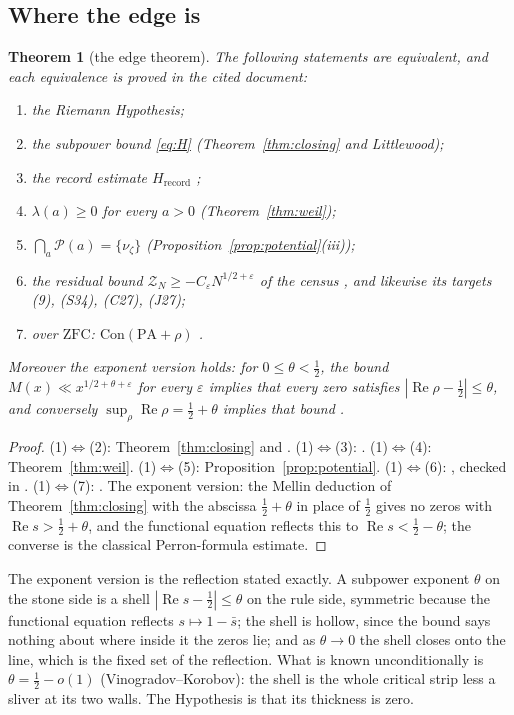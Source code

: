 \documentclass[11pt]{article}
\newtheorem{theorem}{Theorem}[section]
\theoremstyle{definition}
\theoremstyle{remark}
\newcommand{\PA}{\mathrm{PA}}
\newcommand{\ZFC}{\mathrm{ZFC}}
\newcommand{\Con}{\mathrm{Con}}
\newcommand{\PS}{\mathcal P}
\newcommand{\Hrec}{H_{\mathrm{record}}}
\newcommand{\Ree}{\operatorname{Re}}
\begin{document}
\subsection{Where the edge is}
\begin{theorem}[the edge theorem]\label{thm:edge}
The following statements are equivalent, and each equivalence is proved in the cited document:
\begin{enumerate}
\item[(1)] the Riemann Hypothesis;
\item[(2)] the subpower bound \eqref{eq:H} (Theorem~\ref{thm:closing} and Littlewood);
\item[(3)] the record estimate $\Hrec$ \cite[Thm.\ 3.1]{hrec};
\item[(4)] $\lambda(a)\ge0$ for every $a>0$ (Theorem~\ref{thm:weil});
\item[(5)] $\bigcap_a\PS(a)=\{\nu_\zeta\}$ (Proposition~\ref{prop:potential}(iii));
\item[(6)] the residual bound $\mathcal Z_N\ge-C_\varepsilon N^{1/2+\varepsilon}$ of the census \cite[\S62]{census}, and likewise its targets (9), (S34), (C27), (J27);
\item[(7)] over $\ZFC$: $\Con(\PA+\rho)$ \cite[Thm.\ 5.1]{gstring}.
\end{enumerate}
Moreover the exponent version holds: for $0\le\theta<\tfrac12$, the bound $M(x)\ll x^{1/2+\theta+\varepsilon}$ for every $\varepsilon$ implies that every zero satisfies $|\Ree\rho-\tfrac12|\le\theta$, and conversely $\sup_\rho\Ree\rho=\tfrac12+\theta$ implies that bound \cite[\S14.25]{titchmarsh}.
\end{theorem}
\begin{proof}
(1)$\Leftrightarrow$(2): Theorem~\ref{thm:closing} and \cite[\S14.25]{titchmarsh}. (1)$\Leftrightarrow$(3): \cite[Thm.\ 3.1]{hrec}. (1)$\Leftrightarrow$(4): Theorem~\ref{thm:weil}. (1)$\Leftrightarrow$(5): Proposition~\ref{prop:potential}. (1)$\Leftrightarrow$(6): \cite[\S\S4, 26, 62]{census}, checked in \cite[\S4]{censusaudit}. (1)$\Leftrightarrow$(7): \cite[Thm.\ 5.1(iii)]{gstring}. The exponent version: the Mellin deduction of Theorem~\ref{thm:closing} with the abscissa $\tfrac12+\theta$ in place of $\tfrac12$ gives no zeros with $\Ree s>\tfrac12+\theta$, and the functional equation reflects this to $\Ree s<\tfrac12-\theta$; the converse is the classical Perron-formula estimate.
\end{proof}

The exponent version is the reflection stated exactly. A subpower exponent $\theta$ on the stone side is a shell $|\Ree s-\tfrac12|\le\theta$ on the rule side, symmetric because the functional equation reflects $s\mapsto1-\bar s$; the shell is hollow, since the bound says nothing about where inside it the zeros lie; and as $\theta\to0$ the shell closes onto the line, which is the fixed set of the reflection. What is known unconditionally is $\theta=\tfrac12-o(1)$ (Vinogradov--Korobov): the shell is the whole critical strip less a sliver at its two walls. The Hypothesis is that its thickness is zero.
\end{document}
